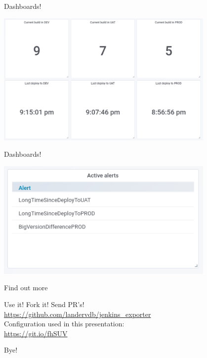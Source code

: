 \documentclass[aspectratio=169,12pt]{beamer}
\begin{document}
\begin{frame}{Dashboards!}
  \begin{center}
    \includegraphics[width=0.8\textwidth]{img/stats.png}
  \end{center}
\end{frame}

\begin{frame}{Dashboards!}
  \begin{center}
    \includegraphics[width=0.8\textwidth]{img/alerts.png}
  \end{center}
\end{frame}

\begin{frame}[fragile]{Find out more}
  \begin{center}
    Use it! Fork it! Send PR's! \\ 
    \url{https://github.com/landervdb/jenkins_exporter} \\ 
    \vspace{20pt}
    Configuration used in this presentation: \\
    \url{https://git.io/fhSUV}
  \end{center}
\end{frame}

\begin{frame}[standout]
  Bye!
\end{frame}
\end{document}
